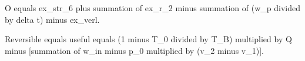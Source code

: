 O equals ex_str_6 plus summation of ex_r_2 minus summation of (w_p divided by delta t) minus ex_verl.  

Reversible equals useful equals (1 minus T_0 divided by T_B) multiplied by Q minus [summation of w_in minus p_0 multiplied by (v_2 minus v_1)].